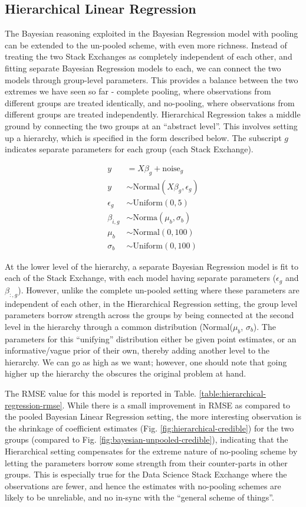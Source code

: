 \documentclass[12pt]{article}
\begin{document}
\subsection{Hierarchical Linear Regression}
The Bayesian reasoning exploited in the Bayesian Regression model with pooling can be extended to the un-pooled scheme, with even more richness. Instead of treating the two Stack Exchanges as completely independent of each other, and fitting separate Bayesian Regression models to each, we can connect the two models through group-level parameters. This provides a balance between the two extremes we have seen so far - complete pooling, where observations from different groups are treated identically, and no-pooling, where observations from different groups are treated independently. Hierarchical Regression takes a middle ground by connecting the two groups at an ``abstract level''. This involves setting up a hierarchy, which is specified in the form described below. The subscript $g$ indicates separate parameters for each group (each Stack Exchange).

\begin{align*}
y &=X\beta_g + \text{noise}_g \\
y &\sim \text{Normal}(X\beta_g, \epsilon_g) \\
\epsilon_g &\sim \text{Uniform}(0,5) \\
\beta_{i,g} &\sim \text{Norma}(\mu_b, \sigma_b) \\
\mu_b &\sim \text{Normal}(0, 100) \\
\sigma_b &\sim \text{Uniform}(0, 100)
\end{align*}

At the lower level of the hierarchy, a separate Bayesian Regression model is fit to each of the Stack Exchange, with each model having separate parameters ($\epsilon_g$ and $\beta_{:, g}$). However, unlike the complete un-pooled setting where these parameters are independent of each other, in the Hierarchical Regression setting, the group level parameters borrow strength across the groups by being connected at the second level in the hierarchy through a common distribution (Normal($\mu_b$, $\sigma_b$). The parameters for this ``unifying'' distribution either be given point estimates, or an informative/vague prior of their own, thereby adding another level to the hierarchy. We can go as high as we want; however, one should note that going higher up the hierarchy the obscures the original problem at hand.

The RMSE value for this model is reported in Table. \ref{table:hierarchical-regression-rmse}. While there is a small improvement in RMSE as compared to the pooled Bayesian Linear Regression setting, the more interesting observation is the shrinkage of coefficient estimates (Fig. \ref{fig:hierarchical-credible}) for the two groups (compared to Fig. \ref{fig:bayesian-unpooled-credible}), indicating that the Hierarchical setting compensates for the extreme nature of no-pooling scheme by letting the parameters borrow some strength from their counter-parts in other groups. This is especially true for the Data Science Stack Exchange where the observations are fewer, and hence the estimates with no-pooling schemes are likely to be unreliable, and no in-sync with the ``general scheme of things''.
\end{document}
